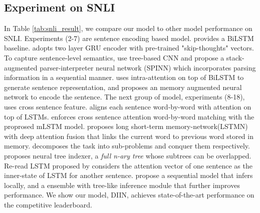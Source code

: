 \documentclass{article} \usepackage{iclr2018_conference,times}
\begin{document}
\subsection{Experiment on SNLI}
In Table \ref{tab:snli_result}, we compare our model to other model performance on SNLI. Experiments (2-7) are sentence encoding based model. \citet{spinnBowman:2016um} provides a BiLSTM baseline. \citet{pretrainGRU_Vendrov:2015ua} adopts two layer GRU encoder with pre-trained "skip-thoughts" vectors. To capture sentence-level semantics, \citet{treeCNN_Mou:2015tp} use tree-based CNN and \citet{spinnBowman:2016um} propose a stack-augmented parser-interpreter neural network (SPINN) which incorporates parsing information in a sequential manner. \citet{bilstm_intraatt_Liu:2016tz} uses intra-attention on top of BiLSTM to generate sentence representation, and \citet{NSEMunkhdalai:2016th} proposes an memory augmented neural network to encode the sentence. The next group of model, experiments (8-18), uses cross sentence feature. \citet{LSTM_att_Rocktaschel:2015wu} aligns each sentence word-by-word with attention on top of LSTMs. \citet{mLSTM_Wang:2015vx} enforces cross sentence attention word-by-word matching with the proprosed mLSTM model. \citet{LSTMN_Cheng:2016wu} proposes long short-term memory-network(LSTMN) with deep attention fusion that links the current word to previous word stored in memory. \citet{decomposable_Parikh:2016tz} decomposes the task into sub-problems and conquer them respectively. \citet{NTI_Yu:2017wd} proposes neural tree indexer, a \textit{full n-ary tree} whose subtrees can be overlapped. Re-read LSTM proposed by \citet{re_read_Sha:2016ws} considers the attention vector of one sentence as the inner-state of LSTM for another sentence. \citet{ESIM_Chen:2016wn} propose a sequential model that infers locally, and a ensemble with tree-like inference module that further improves performance. We show our model, DIIN, achieves state-of-the-art performance on the competitive leaderboard.
\end{document}

